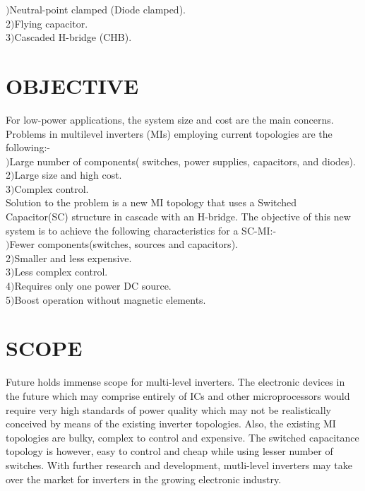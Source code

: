 \documentclass[12pt,a4paper]{report}
\begin{document}
$)$Neutral-point clamped (Diode clamped).\\
2$)$Flying capacitor.\\
3$)$Cascaded H-bridge (CHB).\\

\section{OBJECTIVE}

\noindent For low-power applications, the system size and cost are the main concerns.
Problems in multilevel inverters (MIs) employing current topologies are the following:-\\

$)$Large number of components( switches, power supplies, capacitors, and diodes).\\
2$)$Large size and high cost.\\
3$)$Complex control.\\

\noindent Solution to the problem is a new MI topology that uses a Switched Capacitor(SC) structure in cascade with an H-bridge. The objective of this new system is to achieve the following characteristics for a  SC-MI:-\\

$)$Fewer components(switches, sources and capacitors).\\
2$)$Smaller and less expensive.\\
3$)$Less complex control.\\
4$)$Requires only one power DC source.\\
5$)$Boost operation without magnetic elements.\\
	
\section{SCOPE}	

Future holds immense scope for multi-level inverters. The electronic devices in the future which may comprise entirely of ICs and other microprocessors would require very high standards of power quality which may not be realistically conceived by means of the existing inverter topologies. Also, the existing MI topologies are bulky, complex to control and expensive. The switched capacitance topology is however, easy to control and cheap while using lesser number of switches.
With further research and development, mutli-level inverters may take over the market for inverters in the growing electronic industry.
\end{document}
